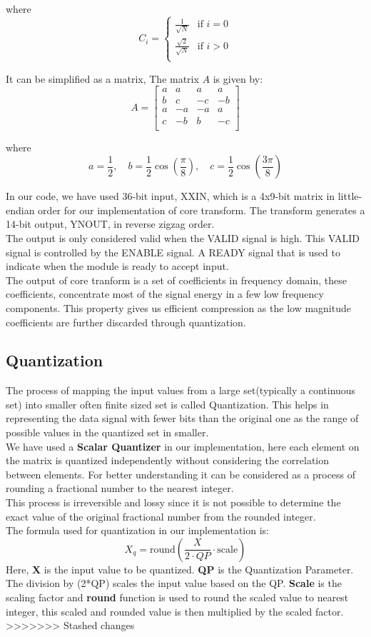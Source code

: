 where
\[
C_i = \begin{cases} 
	\frac{1}{\sqrt{N}} & \text{if } i = 0 \\
	\frac{\sqrt{2}}{\sqrt{N}} & \text{if } i > 0 \\
\end{cases}
\]

It can be simplified as a matrix, The matrix $A$ is given by:
\[
A = \begin{bmatrix}
	a & a & a & a \\
	b & c & -c & -b \\
	a & -a & -a & a \\
	c & -b & b & -c \\
\end{bmatrix}
\]

where
\[
a = \frac{1}{2}, \quad
b = \frac{1}{2}\cos\left(\frac{\pi}{8}\right), \quad
c = \frac{1}{2}\cos\left(\frac{3\pi}{8}\right)
\]

In our code, we have used 36-bit input, XXIN, which is a 4x9-bit matrix in little-endian order for our implementation of core transform. The transform generates a 14-bit output, YNOUT, in reverse zigzag order.\\
The output is only considered valid when the VALID signal is high. This VALID signal is controlled by the ENABLE signal. A READY signal that is used to indicate when the module is ready to accept input.\\
The output of core tranform is a set of coefficients in frequency domain, these coefficients, concentrate most of the signal energy in a few low frequency components. This property gives us efficient compression as the low magnitude coefficients are further discarded through quantization.

\subsection{Quantization}
The process of mapping the input values from a large set(typically a continuous set) into smaller often finite sized set is called Quantization. This helps in representing the data signal with fewer bits than the original one as the range of possible values in the quantized set in smaller.\\
We have used a \textbf{Scalar Quantizer} in our implementation, here each element on the matrix is quantized independently without considering the correlation between elements. For better understanding it can be considered as a process of rounding a fractional number to the nearest integer.\\
This process is irreversible and lossy since it is not possible to determine the exact value of the original fractional number from the rounded integer.\\
The formula used for quantization in our implementation is:
\[
X_q = \text{round}\left(\frac{X}{{2 \cdot QP}} \cdot \text{scale}\right)
\]
Here, \textbf{X} is the input value to be quantized. \textbf{QP} is the Quantization Parameter. The division by (2*QP) scales the input value based on the QP. \textbf{Scale} is the scaling factor and \textbf{round} function is used to round the scaled value to nearest integer, this scaled and rounded value is then multiplied by the scaled factor.
>>>>>>> Stashed changes
